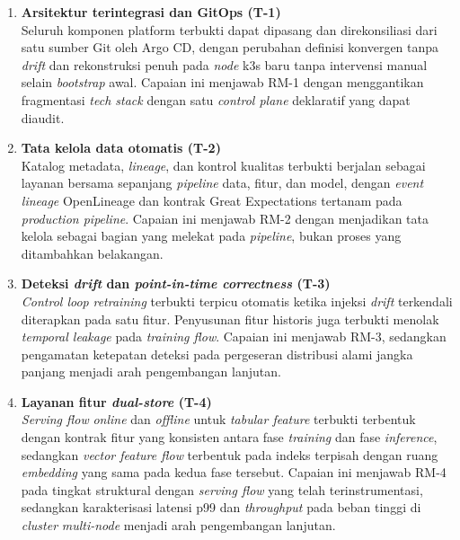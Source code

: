 \begin{enumerate}
  \item \textbf{Arsitektur terintegrasi dan GitOps (T-1)} \\
  Seluruh komponen platform terbukti dapat dipasang dan direkonsiliasi dari satu sumber Git oleh Argo CD, dengan perubahan definisi konvergen tanpa \textit{drift} dan rekonstruksi penuh pada \textit{node} k3s baru tanpa intervensi manual selain \textit{bootstrap} awal. Capaian ini menjawab RM-1 dengan menggantikan fragmentasi \textit{tech stack} dengan satu \textit{control plane} deklaratif yang dapat diaudit.
  \item \textbf{Tata kelola data otomatis (T-2)} \\
  Katalog metadata, \textit{lineage}, dan kontrol kualitas terbukti berjalan sebagai layanan bersama sepanjang \textit{pipeline} data, fitur, dan model, dengan \textit{event} \textit{lineage} OpenLineage dan kontrak Great Expectations tertanam pada \textit{production pipeline}. Capaian ini menjawab RM-2 dengan menjadikan tata kelola sebagai bagian yang melekat pada \textit{pipeline}, bukan proses yang ditambahkan belakangan.
  \item \textbf{Deteksi \textit{drift} dan \textit{point-in-time correctness} (T-3)} \\
  \textit{Control loop} \textit{retraining} terbukti terpicu otomatis ketika injeksi \textit{drift} terkendali diterapkan pada satu fitur. Penyusunan fitur historis juga terbukti menolak \textit{temporal leakage} pada \textit{training flow}. Capaian ini menjawab RM-3, sedangkan pengamatan ketepatan deteksi pada pergeseran distribusi alami jangka panjang menjadi arah pengembangan lanjutan.
  \item \textbf{Layanan fitur \textit{dual-store} (T-4)} \\
  \textit{Serving flow} \textit{online} dan \textit{offline} untuk \textit{tabular feature} terbukti terbentuk dengan kontrak fitur yang konsisten antara fase \textit{training} dan fase \textit{inference}, sedangkan \textit{vector feature flow} terbentuk pada indeks terpisah dengan ruang \textit{embedding} yang sama pada kedua fase tersebut. Capaian ini menjawab RM-4 pada tingkat struktural dengan \textit{serving flow} yang telah terinstrumentasi, sedangkan karakterisasi latensi p99 dan \textit{throughput} pada beban tinggi di \textit{cluster} \textit{multi-node} menjadi arah pengembangan lanjutan.
\end{enumerate}


